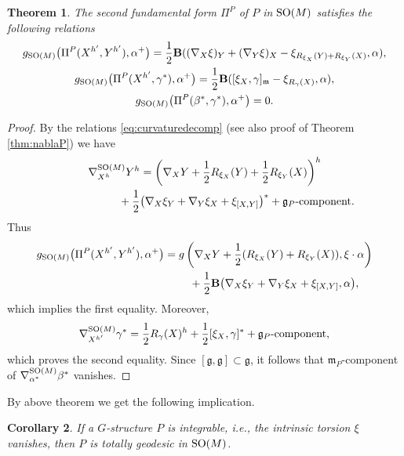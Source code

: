 \documentclass[pdftex]{sigma}
\numberwithin{equation}{section}
\newtheorem{Theorem}{Theorem}[section]
\newtheorem{Corollary}[Theorem]{Corollary}
\begin{document}
\begin{Theorem}\label{thm:secfundformP}
The second fundamental form $\Pi^P$ of $P$ in ${\rm SO}(M)$ satisfies the following relations
\begin{gather*}
g_{{\rm SO}(M)}\big(\Pi^P(X^{h'},Y^{h'}),\alpha^{+}\big) =\frac{1}{2}{\bf B}((\nabla_X\xi)_Y+(\nabla_Y\xi)_X-\xi_{R_{\xi_X}(Y)+R_{\xi_Y}(X)},\alpha),\\
g_{{\rm SO}(M)}\big(\Pi^P(X^{h'},\gamma^{\ast}),\alpha^{+}\big) =\frac{1}{2}{\bf B}([\xi_X,\gamma]_{\mathfrak{m}}-\xi_{R_{\gamma}(X)},\alpha),\\
g_{{\rm SO}(M)}\big(\Pi^P(\beta^{\ast},\gamma^{\ast}),\alpha^{+}\big)=0.
\end{gather*}
\end{Theorem}
\begin{proof}
By the relations \eqref{eq:curvaturedecomp} (see also proof of Theorem \ref{thm:nablaP}) we have
\begin{gather*}
\nabla^{{\rm SO}(M)}_{X^h}Y^h  =\left( \nabla_XY+\frac{1}{2}R_{\xi_X}(Y)+\frac{1}{2}R_{\xi_Y}(X) \right)^h\\
\hphantom{\nabla^{{\rm SO}(M)}_{X^h}Y^h  =}{} +\frac{1}{2}\big( \nabla_X\xi_Y+\nabla_Y\xi_X+\xi_{[X,Y]} \big)^{\ast}+\textrm{$\mathfrak{g}_P$-component}.
\end{gather*}
Thus
\begin{gather*}
g_{{\rm SO}(M)}\big(\Pi^P(X^{h'},Y^{h'}),\alpha^{+}\big) =g\left(\nabla_XY+\frac{1}{2}(R_{\xi_X}(Y)+R_{\xi_Y}(X)),\xi\cdot\alpha\right)\\
\hphantom{g_{{\rm SO}(M)}\big(\Pi^P(X^{h'},Y^{h'}),\alpha^{+}\big) =}{}
+\frac{1}{2}{\bf B}\big(\nabla_X\xi_Y+\nabla_Y\xi_X+\xi_{[X,Y]},\alpha\big),
\end{gather*}
which implies the f\/irst equality. Moreover,
\begin{gather*}
\nabla^{{\rm SO}(M)}_{X^{h'}}\gamma^{\ast}=\frac{1}{2}R_{\gamma}(X)^h+
\frac{1}{2}[\xi_X,\gamma]^{\ast}+\textrm{$\mathfrak{g}_P$-component},
\end{gather*}
which proves the second equality. Since $[\mathfrak{g},\mathfrak{g}]\subset\mathfrak{g}$, it follows that $\mathfrak{m}_P$-component of $\nabla^{{\rm SO}(M)}_{\alpha^{\ast}}\beta^{\ast}$ vanishes.
\end{proof}

By above theorem we get the following implication.

\begin{Corollary}\label{cor:totgeodP}
If a $G$-structure $P$ is integrable, i.e., the intrinsic torsion $\xi$ vanishes, then $P$ is totally geodesic in ${\rm SO}(M)$.
\end{Corollary}
\end{document}
